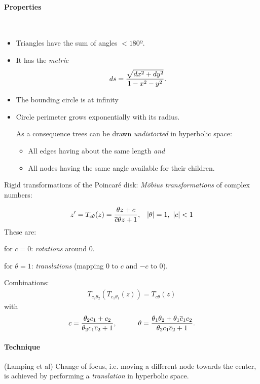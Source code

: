 \paragraph{Properties} $\ $
\begin{itemize}
\item Triangles have the sum of angles $< 180º$.
\item It has the \emph{metric} 
    \begin{align*}
     ds = {\sqrt{dx^2+dy^2} \over 1-x^2-y^2}.
    \end{align*}
\item The bounding circle is at infinity
\item Circle perimeter grows exponentially with its radius.

    As a consequence trees can be drawn \emph{undistorted} in hyperbolic space:
    \begin{itemize}
        \item All edges having about the same length \emph{and}
        \item All nodes having the same angle available for their children.
    \end{itemize}
\end{itemize}

Rigid transformations of the Poincaré disk: \emph{Möbius transformations} of complex numbers:

\begin{align*}
 z'= T_{c\theta} (z) &= {\theta z + c\over \overline c \theta z + 1}, &
     |\theta| = 1,\ |c| < 1 
\end{align*}
These are:
\begin{description}
\item for $c=0$: \emph{rotations} around $0$.
\item for $\theta=1$: \emph{translations} (mapping $0$ to $c$ and $-c$ to $0$).
\item Combinations:
    \begin{align*}
        T_{c_2\theta_2}(T_{c_1\theta_1}(z)) = T_{c\theta} (z)
    \end{align*}
    with
    \begin{align*}
     c= {\theta_2 c_1 + c_2\over \theta_2 c_1 \overline c_2 + 1}, \qquad\quad \theta = {\theta_1\theta_2 + \theta_1\overline c_1 c_2\over \theta_2 c_1 \overline c_2 + 1}.
    \end{align*}

\end{description}

\paragraph{Technique} (Lamping et al) Change of focus, i.e. moving a different node towards the center, is achieved by performing a \emph{translation} in hyperbolic space. 

